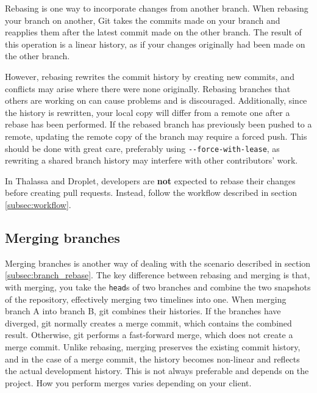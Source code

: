 \documentclass[12pt,a4paper]{article}
\begin{document}
        Rebasing is one way to incorporate changes from another branch. When rebasing your branch on another, Git takes the commits made on your branch and reapplies them after the latest commit made on the other branch. The result of this operation is a linear history, as if your changes originally had been made on the other branch.

        However, rebasing rewrites the commit history by creating new commits, and conflicts may arise where there were none originally. Rebasing branches that others are working on can cause problems and is discouraged. Additionally, since the history is rewritten, your local copy will differ from a remote one after a rebase has been performed. If the rebased branch has previously been pushed to a remote, updating the remote copy of the branch may require a forced push. This should be done with great care, preferably using \verb|--force-with-lease|, as rewriting a shared branch history may interfere with other contributors' work.
        
        In Thalassa and Droplet, developers are \textbf{not} expected to rebase their changes before creating pull requests. Instead, follow the workflow described in section \ref{subsec:workflow}.

    \subsection{Merging branches}
    \label{subsec:branch_merge}
        Merging branches is another way of dealing with the scenario described in section \ref{subsec:branch_rebase}. The key difference between rebasing and merging is that, with merging, you take the \verb|head|s of two branches and combine the two snapshots of the repository, effectively merging two timelines into one. When merging branch A into branch B, git combines their histories. If the branches have diverged, git normally creates a merge commit, which contains the combined result. Otherwise, git performs a fast-forward merge, which does not create a merge commit. Unlike rebasing, merging preserves the existing commit history, and in the case of a merge commit, the history becomes non-linear and reflects the actual development history. This is not always preferable and depends on the project. How you perform merges varies depending on your client.
        

\small
\printbibliography
\end{document}
